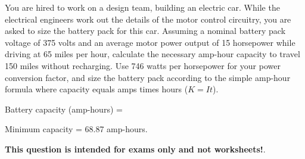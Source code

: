 

You are hired to work on a design team, building an electric car.  While the electrical engineers work out the details of the motor control circuitry, you are asked to size the battery pack for this car.  Assuming a nominal battery pack voltage of 375 volts and an average motor power output of 15 horsepower while driving at 65 miles per hour, calculate the necessary amp-hour capacity to travel 150 miles without recharging.  Use 746 watts per horsepower for your power conversion factor, and size the battery pack according to the simple amp-hour formula where capacity equals amps times hours ($K = It$).

\vskip 10pt

Battery capacity (amp-hours) = 







Minimum capacity = 68.87 amp-hours.







{\bf This question is intended for exams only and not worksheets!}.



